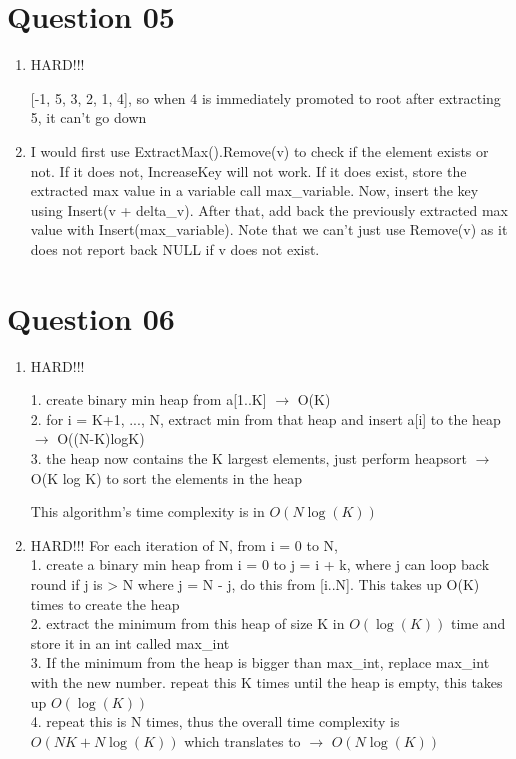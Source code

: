 \documentclass{article}
\begin{document}
\section{Question 05}
\begin{enumerate}[label=(\alph*)]

\item HARD!!!

[-1, 5, 3, 2, 1, 4], so when 4 is immediately promoted to root after extracting 5, it can't go down

\item I would first use ExtractMax().Remove(v) to check if the element exists or not. If it does not, IncreaseKey will not work. If it does exist, store the extracted max value in a variable call max\_variable. Now, insert the key using Insert(v + delta\_v). After that, add back the previously extracted max value with Insert(max\_variable). Note that we can't just use Remove(v) as it does not report back NULL if v does not exist.
\end{enumerate}

\section{Question 06}
\begin{enumerate}[label=(\alph*)]

\item HARD!!!

1. create binary min heap from a[1..K] $\rightarrow$ O(K)
\\
2. for i = K+1, ..., N, extract min from that heap and insert a[i] to the heap $\rightarrow$ O((N-K)logK)
\\
3. the heap now contains the K largest elements, just perform heapsort $\rightarrow$ O(K log K) to sort the elements in the heap

This algorithm's time complexity is in $O(N\log(K))$

\item HARD!!!
For each iteration of N, from i = 0 to N,
\\
1. create a binary min heap from i = 0 to j = i + k, where j can loop back round if j is > N where j = N - j, do this from [i..N]. This takes up O(K) times to create the heap
\\
2. extract the minimum from this heap of size K in $O(\log(K))$ time and store it in an int called max\_int
\\
3. If the minimum from the heap is bigger than max\_int, replace max\_int with the new number. repeat this K times until the heap is empty, this takes up $O(\log(K))$
\\
4. repeat this is N times, thus the overall time complexity is $O(NK + N \log(K))$ which translates to $\rightarrow$ $O(N \log(K))$ 




\end{enumerate}
\end{document}
